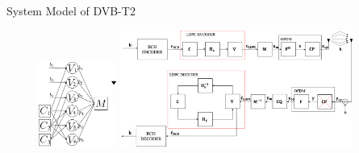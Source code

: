 \documentclass[11pt, aspectratio=169]{beamer}
\begin{document}
\begin{frame}{System Model of DVB-T2}

	\begin{figure}
	\centering
	\begin{minipage}{.5\linewidth}
		\hspace{0.5cm}
		\includegraphics[width=1in]{sumber/encoder2.pdf}
		\vspace{-0.5cm}
		
	\end{minipage}
	\hfill 	
	\hspace{ -2in}
	\begin{minipage}{.5\linewidth}
		\includegraphics[width=3in]{gambarafa/sistemmo}
		

\end{minipage}
\end{figure}
\end{frame}
\end{document}

